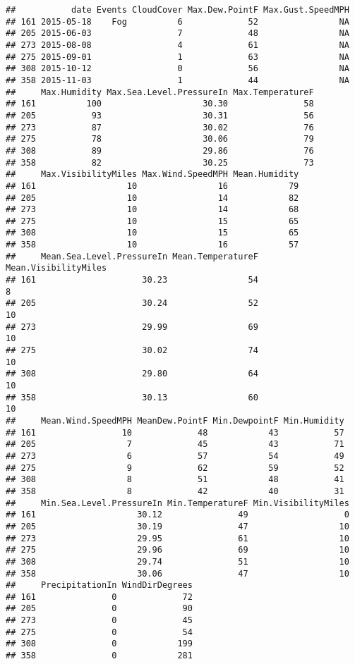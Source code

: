 \documentclass[]{article}
\begin{document}
\begin{verbatim}
##           date Events CloudCover Max.Dew.PointF Max.Gust.SpeedMPH
## 161 2015-05-18    Fog          6             52                NA
## 205 2015-06-03                 7             48                NA
## 273 2015-08-08                 4             61                NA
## 275 2015-09-01                 1             63                NA
## 308 2015-10-12                 0             56                NA
## 358 2015-11-03                 1             44                NA
##     Max.Humidity Max.Sea.Level.PressureIn Max.TemperatureF
## 161          100                    30.30               58
## 205           93                    30.31               56
## 273           87                    30.02               76
## 275           78                    30.06               79
## 308           89                    29.86               76
## 358           82                    30.25               73
##     Max.VisibilityMiles Max.Wind.SpeedMPH Mean.Humidity
## 161                  10                16            79
## 205                  10                14            82
## 273                  10                14            68
## 275                  10                15            65
## 308                  10                15            65
## 358                  10                16            57
##     Mean.Sea.Level.PressureIn Mean.TemperatureF Mean.VisibilityMiles
## 161                     30.23                54                    8
## 205                     30.24                52                   10
## 273                     29.99                69                   10
## 275                     30.02                74                   10
## 308                     29.80                64                   10
## 358                     30.13                60                   10
##     Mean.Wind.SpeedMPH MeanDew.PointF Min.DewpointF Min.Humidity
## 161                 10             48            43           57
## 205                  7             45            43           71
## 273                  6             57            54           49
## 275                  9             62            59           52
## 308                  8             51            48           41
## 358                  8             42            40           31
##     Min.Sea.Level.PressureIn Min.TemperatureF Min.VisibilityMiles
## 161                    30.12               49                   0
## 205                    30.19               47                  10
## 273                    29.95               61                  10
## 275                    29.96               69                  10
## 308                    29.74               51                  10
## 358                    30.06               47                  10
##     PrecipitationIn WindDirDegrees
## 161               0             72
## 205               0             90
## 273               0             45
## 275               0             54
## 308               0            199
## 358               0            281
\end{verbatim}
\end{document}
